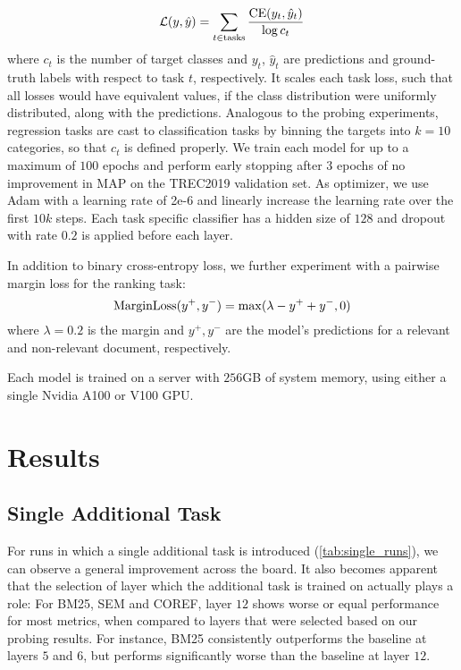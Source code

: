 \begin{equation}
    \mathcal{L}(y, \hat{y}) = \sum_{t \in \text{tasks}} \frac{\textnormal{CE}(y_t, \hat{y}_t)}{\log c_t}
\end{equation}
where $c_t$ is the number of target classes and $y_t$, $\hat{y}_t$ are predictions and ground-truth labels with respect to task $t$, respectively. It scales each task loss, such that all losses would have equivalent values, if the class distribution were uniformly distributed, along with the predictions. Analogous to the probing experiments, regression tasks are cast to classification tasks by binning the targets into $k=10$ categories, so that $c_t$ is defined properly.
We train each model for up to a maximum of $100$ epochs and perform early stopping after $3$ epochs of no improvement in MAP on the TREC2019 validation set. As optimizer, we use Adam \cite{kingma2014adam} with a learning rate of 2e-6 and linearly increase the learning rate over the first $10k$ steps. Each task specific classifier has a hidden size of $128$ and dropout with rate $0.2$ is applied before each layer.

In addition to binary cross-entropy loss, we further experiment with a pairwise margin loss for the ranking task:
\begin{equation}
    \text{MarginLoss}(y^+, y^-) = \max(\lambda - y^+ + y^-, 0)
\end{equation}
where $\lambda=0.2$ is the margin and $y^+, y^-$ are the model's predictions for a relevant and non-relevant document, respectively.

Each model is trained on a server with $256$GB of system memory, using either a single Nvidia A100 or V100 GPU.


\section{Results}
\label{sec:mtl_results}
\subsection{Single Additional Task}
For runs in which a single additional task is introduced (\autoref{tab:single_runs}), we can observe a general improvement across the board. It also becomes apparent that the selection of layer which the additional task is trained on actually plays a role: For BM25, SEM and COREF, layer $12$ shows worse or equal performance for most metrics, when compared to layers that were selected based on our probing results. For instance, BM25 consistently outperforms the baseline at layers $5$ and $6$, but performs significantly worse than the baseline at layer $12$.

